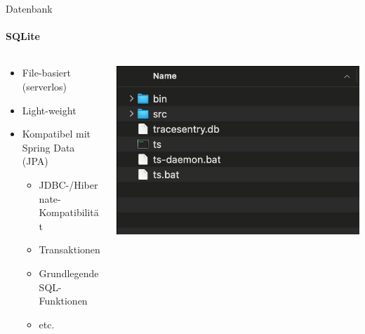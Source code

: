 \documentclass[
    ngerman,%
    authorontitle=true,
]{bfhbeamer}
\begin{document}
    \begin{frame}{Datenbank}
        \framesubtitle{SQLite}
        \begin{columns}
            \begin{column}{0.7\textwidth}
                \begin{itemize}
                    \item File-basiert (serverlos)
                    \item Light-weight
                    \item Kompatibel mit Spring Data (JPA)
                    \begin{itemize}
                        \item JDBC-/Hibernate-Kompatibilität
                        \item Transaktionen
                        \item Grundlegende SQL-Funktionen
                        \item etc.
                    \end{itemize}
                \end{itemize}
            \end{column}
            \begin{column}{0.3\textwidth}
                \begin{center}
                    \includegraphics[width=1\textwidth]{assets/presentation/db}
                \end{center}
            \end{column}
        \end{columns}
    \end{frame}
\end{document}
